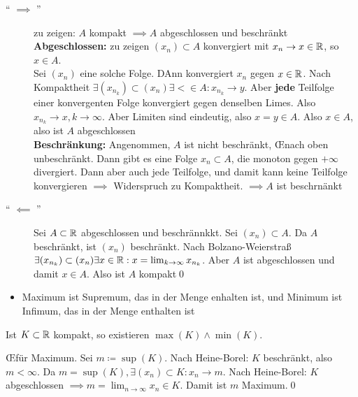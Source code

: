 \begin{subproof*}
	\begin{description}
		\item[`` $ \implies $ ''] zu zeigen: $ A $ kompakt $ \implies A $ abgeschlossen und beschränkt\\
			\textbf{Abgeschlossen:} zu zeigen $ (x_n) \subset A $ konvergiert mit $ x_n \to x \in \mathbb{R} $, so $ x \in  A $.\\
			Sei $ (x_n) $ eine solche Folge. DAnn konvergiert $ x_n $ gegen $ x \in  \mathbb{R} $. Nach Kompaktheit $ \exists (x_{n_k}) \subset (x_n) \exists < \in  A: x_{n_k} \to y $. Aber \textbf{jede} Teilfolge einer konvergenten Folge konvergiert gegen denselben Limes. Also $ x_{n_k} \to x, k \to \infty $. Aber Limiten sind eindeutig, also $ x = y \in  A $. Also $ x \in  A $, also ist $ A $ abgeschlossen\\
			\textbf{Beschränkung:} Angenommen, $ A $ ist nicht beschränkt, \OE nach oben unbeschränkt. Dann gibt es eine Folge $ x_n \subset A $, die monoton gegen $ +\infty $ divergiert. Dann aber auch jede Teilfolge, und damit kann keine Teilfolge konvergieren $ \implies $ Widerspruch zu Kompaktheit. $ \implies A $ ist beschrnänkt
			\item[`` $ \impliedby $ ''] Sei $  A \subset \mathbb{R} $ abgeschlossen und beschrännkkt. Sei $ (x_n) \subset A $. Da $  A $ beschränkt, ist $ (x_n) $ beschränkt. Nach Bolzano-Weierstraß $ \exists (x_{n_k}) \subset (x_n) \exists x \in \mathbb{R} : x = \lim_{k \to \infty} x_{n_k} $. Aber $ A $ ist abgeschlossen und damit $ x \in A $. Also ist $ A $ kompakt\qed
	\end{description}
\end{subproof*}
\begingroup
\color{blue}
\begin{itemize}
	\item Maximum ist Supremum, das in der Menge enhalten ist, und Minimum ist Infimum, das in der Menge enthalten ist
\end{itemize}
\endgroup

\begin{subtheorem}
	Ist $ K \subset \mathbb{R} $ kompakt, so existieren $  \max(K) \wedge \min(K) $.
\end{subtheorem}

\begin{subproof*}
	\OE für Maximum. Sei $ m \coloneqq \sup(K) $. Nach Heine-Borel: $ K $ beschränkt, also $ m < \infty $. Da $ m = \sup(K), \exists (x_n) \subset K: x_n \to m $. Nach Heine-Borel: $ K $ abgeschlossen $ \implies m = \lim_{n \to \infty} x_n \in K $. Damit ist $ m $ Maximum.\qed
\end{subproof*}

